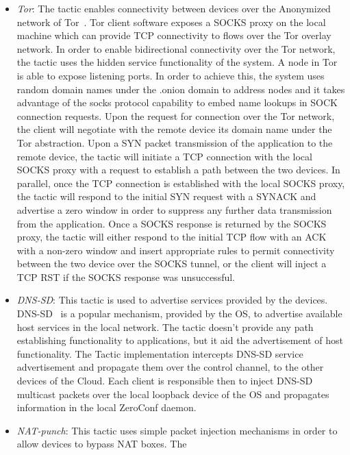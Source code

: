 \begin{itemize}
  \item \emph{Tor}: The tactic enables connectivity between devices over the
    Anonymized network of Tor~\cite{dingledine2006}. Tor client software exposes
    a SOCKS proxy on the local machine which can provide TCP connectivity to
    flows over the Tor overlay network. In order to enable bidirectional
    connectivity over the Tor network, the tactic uses the hidden service
    functionality of the system. A node in Tor is able to expose listening
    ports. In order to achieve this, the system uses random domain names under
    the .onion domain to address nodes and it takes advantage of the socks
    protocol capability to embed name lookups in SOCK connection requests.  Upon
    the request for connection over the Tor network, the \signpost client will
    negotiate with the remote device its domain name under the Tor abstraction.
    Upon a SYN packet transmission of the application to the remote device, the
    tactic will initiate a TCP connection with the local SOCKS proxy with a
    request to establish a path between the two devices. In parallel, once the
    TCP connection is established with the local SOCKS proxy, the tactic will
    respond to the initial SYN request with a SYNACK and advertise a zero window
    in order to suppress any further data transmission from the application.
    Once a SOCKS response is returned by the SOCKS proxy, the tactic will either
    respond to the initial TCP flow with an ACK with a non-zero window and
    insert appropriate \of rules to permit connectivity between the two device
    over the SOCKS tunnel, or the client will inject a TCP RST if the SOCKS
    response was unsuccessful. 
  \item \emph{DNS-SD}: This tactic is used to advertise services provided by the
    \signpost devices. DNS-SD~\cite{RFC6763} is a popular mechanism, provided by
    the OS, to advertise available host services in the local network.  The
    tactic doesn't provide any path establishing functionality to applications,
    but it aid the advertisement of host functionality. The Tactic
    implementation intercepts DNS-SD service advertisement and propagate them
    over the control channel, to the other devices of the Cloud. Each \signpost
    client is responsible then to inject DNS-SD multicast packets over the local
    loopback device of the OS and propagates information in the local ZeroConf
    daemon. 
  \item \emph{NAT-punch}: This tactic uses simple packet injection mechanisms in
    order to allow devices to bypass NAT boxes. The

\end{itemize}
